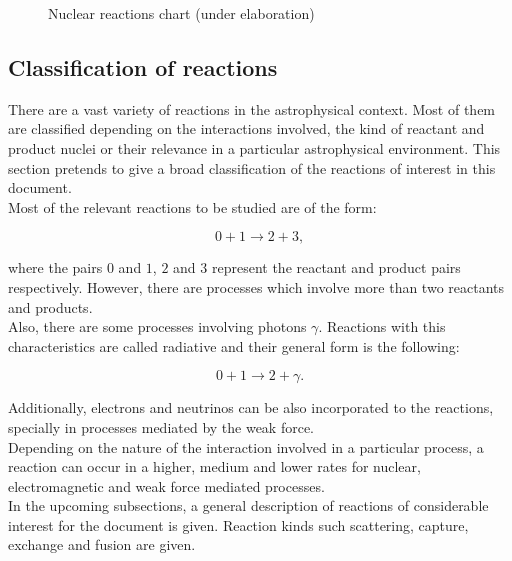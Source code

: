 \documentclass[openany]{book}
\begin{document}
\begin{figure}[H]
	
	\caption[Nuclear reactions chart]{Nuclear reactions chart (under elaboration)}
	\label{fig.nuclerReactionChains}
\end{figure}

\subsection{Classification of reactions} \label{sub:classificationReactions}

There are a vast variety of reactions in the astrophysical context. Most of them are classified depending on the interactions involved, the kind of reactant and product nuclei or their relevance in a particular astrophysical environment. This section pretends to give a broad classification of the reactions of interest in this document.\\ 

Most of the relevant reactions to be studied are of the form: 

\begin{equation} \label{eq:nuclearReaction_general}
	0 + 1 \rightarrow 2 + 3,
\end{equation}

where the pairs $0$ and $1$, $2$ and $3$ represent the reactant and product pairs respectively. However, there are processes which involve more than two reactants and products. \\

Also, there are some processes involving photons $\gamma$. Reactions with this characteristics are called radiative and their general form is the following:

\begin{equation} \label{eq:nuclearReaction_gammaCapture}
		0 + 1 \rightarrow 2 + \gamma.
\end{equation}

Additionally, electrons and neutrinos can be also incorporated to the reactions, specially in processes mediated by the weak force.  \\

Depending on the nature of the interaction involved in a particular process, a reaction can occur in a higher, medium and lower rates for nuclear, electromagnetic and weak force mediated processes. \\

In the upcoming subsections, a general description of reactions of considerable interest for the document is given. Reaction kinds such scattering, capture, exchange and fusion are given. 
\end{document}
